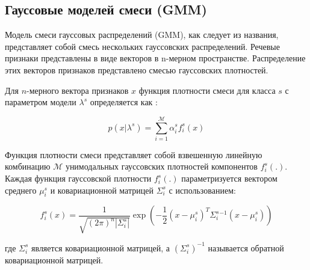 % 

\subsection{Гауссовые моделей смеси (GMM)}

Модель смеси гауссовых распределений (GMM), как следует из названия, представляет собой смесь нескольких гауссовских распределений. Речевые признаки представлены в виде векторов в n-мерном пространстве. Распределение этих векторов признаков представлено смесью гауссовских плотностей. 

Для \(n\)-мерного вектора признаков \(x\) функция плотности смеси для класса \(s\) с параметром модели \(\lambda^{s}\) определяется как \cite{JOTHILAKSHMI2016301}:

\[
    p(x | \lambda^{s}) = \sum_{i = 1}^{\mathcal{M}} \alpha^{s}_{i} f_{i}^{s}(x)
\]

Функция плотности смеси представляет собой взвешенную линейную комбинацию \(\mathcal{M}\) унимодальных гауссовских плотностей компонентов \(f_ {i}^{s}(.)\). Каждая функция гауссовской плотности \(f_{i}^{s}(.)\) параметризуется вектором среднего \(\mu_{i}^{s}\) и ковариационной матрицей \(\Sigma_{i}^{s}\) с использованием:

\[
    f_{i}^{s}(x) = \frac{1}{\sqrt{(2\pi)^{n}|\Sigma_{i}^{s}|}} \exp \left(-\frac{1}{2}(x - \mu_{i}^{s})^T \Sigma_{i}^{s}^{-1} (x - \mu_{i}^{s})\right)
\]

где \(\Sigma_{i}^{s}\) является ковариационной матрицей, а \((\Sigma_{i}^{s})^{-1}\) называется обратной ковариационной матрицей.
% 

